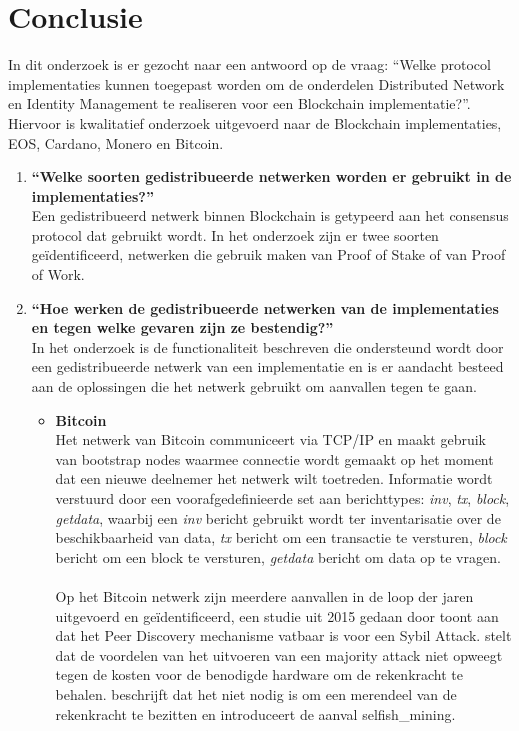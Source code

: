 \newpage
\chapter{Conclusie}

In dit onderzoek is er gezocht naar een antwoord op de vraag: ``Welke protocol implementaties kunnen toegepast worden om de onderdelen Distributed Network en Identity Management te realiseren voor een Blockchain implementatie?''. Hiervoor is kwalitatief onderzoek uitgevoerd naar de Blockchain implementaties, EOS, Cardano, Monero en Bitcoin.

\begin{enumerate}
  \item \textbf{``Welke soorten gedistribueerde netwerken worden er gebruikt in de implementaties?''}
  \\ Een gedistribueerd netwerk binnen Blockchain is getypeerd aan het consensus protocol dat gebruikt wordt. In het onderzoek zijn er twee soorten geïdentificeerd, netwerken die gebruik maken van Proof of Stake of van Proof of Work.

  \item \textbf{``Hoe werken de gedistribueerde netwerken van de implementaties en tegen welke gevaren zijn ze bestendig?''}
  \\ In het onderzoek is de functionaliteit beschreven die ondersteund wordt door een gedistribueerde netwerk van een implementatie en is er aandacht besteed aan de oplossingen die het netwerk gebruikt om aanvallen tegen te gaan. 
  \begin{itemize}
    \item \textbf{Bitcoin}
    \\ Het netwerk van Bitcoin communiceert via TCP/IP en maakt gebruik van bootstrap nodes waarmee connectie wordt gemaakt op het moment dat een nieuwe deelnemer het netwerk wilt toetreden. Informatie wordt verstuurd door een voorafgedefinieerde set aan berichttypes: \textit{inv}, \textit{tx}, \textit{block}, \textit{getdata}, waarbij een \textit{inv} bericht gebruikt wordt ter inventarisatie over de beschikbaarheid van data, \textit{tx} bericht om een transactie te versturen, \textit{block} bericht om een block te versturen, \textit{getdata} bericht om data op te vragen. \\ \\ Op het Bitcoin netwerk zijn meerdere aanvallen in de loop der jaren uitgevoerd en geïdentificeerd, een studie uit 2015 gedaan door \cite{heilman2015eclipse} toont aan dat het Peer Discovery mechanisme vatbaar is voor een Sybil Attack. \cite{nakamoto2008bitcoin} stelt dat de voordelen van het uitvoeren van een majority attack niet opweegt tegen de kosten voor de benodigde hardware om de rekenkracht te behalen. \cite{eyal2014majority} beschrijft dat het niet nodig is om een merendeel van de rekenkracht te bezitten en introduceert de aanval \gls{selfish_mining}.


\end{itemize}
\end{enumerate}
